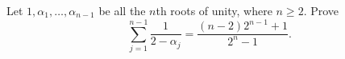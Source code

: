 Let $1,\alpha_1,\ldots,\alpha_{n-1}$ be all the $n$th roots of unity, where $n\ge2$. Prove
\[
\sum_{j=1}^{n-1}\dfrac{1}{2-\alpha_j}
=\dfrac{(n-2)2^{n-1}+1}{2^n-1}.
\]
